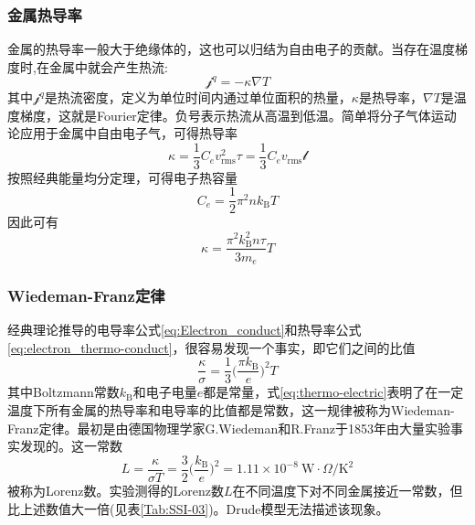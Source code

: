 \subsubsection{金属热导率} 
金属的热导率一般大于绝缘体的，这也可以归结为自由电子的贡献。当存在温度梯度时,在金属中就会产生热流:
\begin{equation}
	\mathscr{j}^q=-\kappa\nabla T
	\label{eq:thermo_current}
\end{equation} 
其中$\mathscr{j}^q$是热流密度，定义为单位时间内通过单位面积的热量，$\kappa$是热导率，$\nabla T$是温度梯度，这就是Fourier定律。负号表示热流从高温到低温。简单将分子气体运动论应用于金属中自由电子气，可得热导率
\begin{equation}
	\kappa=\dfrac13C_ev_{\mathrm{rms}}^2\tau=\dfrac13C_ev_{\mathrm{rms}}\mathscr{l}
	\label{eq:thermo_conduct}
\end{equation}
按照经典能量均分定理，可得电子热容量
\begin{equation}
	C_e=\dfrac12\pi^2nk_{\mathrm{B}}T
	\label{eq:electron_thermo-capacity}
\end{equation}
因此可有
\begin{equation}
	\kappa=\dfrac{\pi^2k_{\mathrm{B}}^2n\tau}{3m_e}T
	\label{eq:electron_thermo-conduct}
\end{equation}
\subsubsection{Wiedeman-Franz定律}
经典理论推导的电导率公式\eqref{eq:Electron_conduct}和热导率公式\eqref{eq:electron_thermo-conduct}，很容易发现一个事实，即它们之间的比值
\begin{equation}
	\dfrac{\kappa}{\sigma}=\dfrac13\bigg(\dfrac{\pi k_{\mathrm{B}}}e\bigg)^2T
	\label{eq:thermo-electric}
\end{equation}
其中Boltzmann常数$k_{\mathrm{B}}$和电子电量$e$都是常量，式\eqref{eq:thermo-electric}表明了在一定温度下所有金属的热导率和电导率的比值都是常数，这一规律被称为Wiedeman-Franz定律。最初是由德国物理学家G.Wiedeman和R.Franz于1853年由大量实验事实发现的。这一常数
\begin{equation}
	L=\dfrac{\kappa}{\sigma T}=\dfrac32\bigg(\dfrac{k_{\mathrm{B}}}e\bigg)^2=1.11\times10^{-8}~\mathrm{W}\cdot\Omega/\mathrm{K}^2
	\label{eq:Wiedeman-Franz_Lorenz}
\end{equation} 
被称为Lorenz数。实验测得的Lorenz数$L$在不同温度下对不同金属接近一常数，但比上述数值大一倍(见表\ref{Tab:SSI-03})。Drude模型无法描述该现象。


